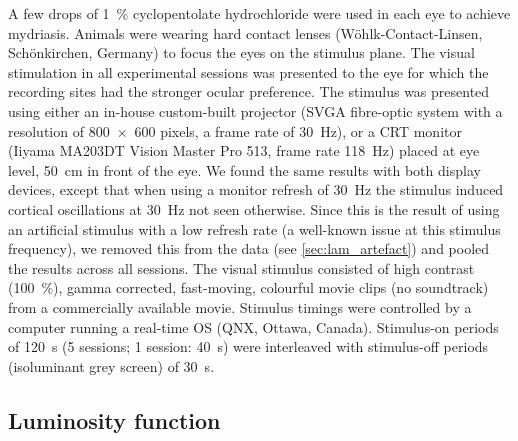 A few drops of \SI{1}{\percent} cyclopentolate hydrochloride were used in each eye to achieve mydriasis.
Animals were wearing hard contact lenses (W\"ohlk-Contact-Linsen, Sch\"onkirchen, Germany) to focus the eyes on the stimulus plane.
The visual stimulation in all experimental sessions was presented to the eye for which the recording sites had the stronger ocular preference.
The stimulus was presented using either an in-house custom-built projector (SVGA fibre-optic system with a resolution of \num{800x600} pixels, a frame rate of \SI{30}{Hz}), or a \ac{CRT} monitor (Iiyama MA203DT Vision Master Pro 513, frame rate \SI{118}{Hz}) placed at eye level, \SI{50}{\centi\metre} in front of the eye.
We found the same results with both display devices, except that when using a monitor refresh of \SI{30}{Hz} the stimulus induced cortical oscillations at \SI{30}{Hz} not seen otherwise.
Since this is the result of using an artificial stimulus with a low refresh rate (a well-known issue at this stimulus frequency), we removed this from the data (see \autoref{sec:lam_artefact}) and pooled the results across all sessions.
The visual stimulus consisted of high contrast (\SI{100}{\percent}), gamma corrected, fast-moving, colourful movie clips (no soundtrack) from a commercially available movie.
Stimulus timings were controlled by a computer running a real-time OS (QNX, Ottawa, Canada).
Stimulus-on periods of \SI{120}{\second} (\num{5} sessions; \num{1} session: \SI{40}{\second}) were interleaved with stimulus-off periods (isoluminant grey screen) of \SI{30}{\second}.


\subsection{Luminosity function}
\label{sec:lam_lumos}

